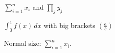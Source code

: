 \documentclass{article}
\begin{document}
{\large $\sum_{i=1}^{n} x_i$ and $\prod_{j} y_j$}

{\Large $\int_0^1 f(x)\,dx$ with big brackets $\left(\frac{a}{b}\right)$}

Normal size: $\sum_{i=1}^{n} x_i$.
\end{document}
